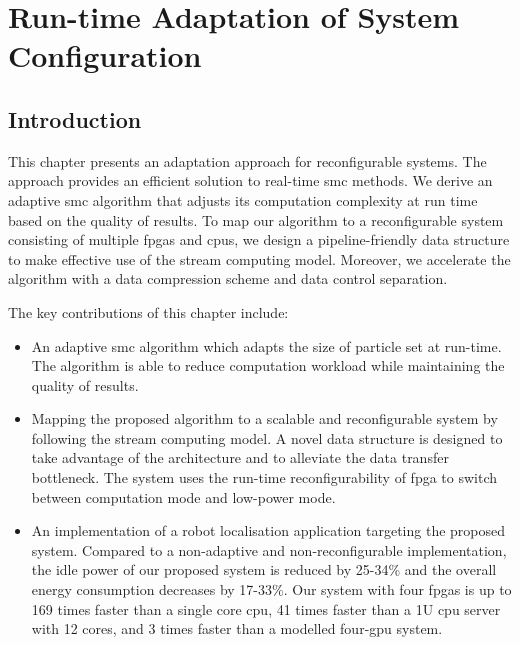 
\chapter[Run-time Adaptation of System Configuration]{Run-time Adaptation of System Configuration}

\label{ch:adaptation}

\section{Introduction}

This chapter presents an adaptation approach for reconfigurable systems.
The approach provides an efficient solution to real-time \gls{smc} methods.
We derive an adaptive \gls{smc} algorithm that adjusts its computation complexity at run time based on the quality of results.
To map our algorithm to a reconfigurable system consisting of multiple \glspl{fpga} and \glspl{cpu},
we design a pipeline-friendly data structure to make effective use of the stream computing model.
Moreover, we accelerate the algorithm with a data compression scheme and data control separation.

The key contributions of this chapter include:

\begin{itemize}
\item An adaptive \gls{smc} algorithm which adapts the size of particle set at run-time. 
The algorithm is able to reduce computation workload while maintaining the quality of results.
\item Mapping the proposed algorithm to a scalable and reconfigurable system by following the stream computing model.
A novel data structure is designed to take advantage of the architecture and to alleviate the data transfer bottleneck.
The system uses the run-time reconfigurability of \gls{fpga} to switch between computation mode and low-power mode.
\item An implementation of a robot localisation application targeting the proposed system. 
Compared to a non-adaptive and non-reconfigurable implementation, the idle power of our proposed system is reduced by 25-34\% and the overall energy consumption decreases by 17-33\%.
Our system with four \glspl{fpga} is up to 169 times faster than a single core \gls{cpu}, 41 times faster than a 1U \gls{cpu} server with 12 cores, and 3 times faster than a modelled four-\gls{gpu} system.
\end{itemize}

